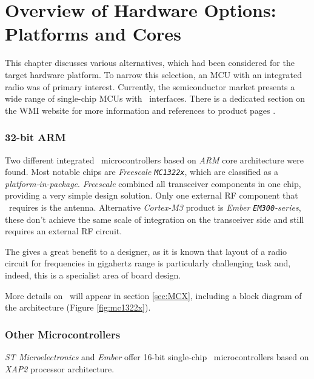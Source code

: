 \section{Overview of Hardware Options: \\Platforms and Cores} \label{sec:hwintro}


 This chapter discusses various alternatives, which had been
 considered for the target hardware platform. To narrow this
 selection, an MCU with an integrated radio was of primary
 interest. Currently, the semiconductor market presents a
 wide range of single-chip MCUs with \WPAN\ interfaces. There
 is a dedicated section on the WMI website for more information
 and references to product pages \cite{wmi:wiki:chips1,
 wmi:wiki:chips2}.

\subsubsection{32-bit ARM}

 Two different integrated \WPAN\ microcontrollers based on 
 \emph{ARM} core architecture were found. Most notable
 chips are \emph{Freescale \texttt{MC1322x}}, which are
 classified as a \emph{platform-in-package}. \emph{Freescale}
 combined all transceiver components in one chip, providing
 a very simple design solution. Only one external RF component
 that \MCX\ requires is the antenna. Alternative \emph{Cortex-M3}
 product is \emph{Ember \texttt{EM300}-series}, these don't
 achieve the same scale of integration on the transceiver side
 and still requires an external RF circuit.

 The  gives a great benefit to a designer, as it
 is known that layout of a radio circuit for frequencies in
 gigahertz range is particularly challenging task and, indeed,
 this is a specialist area of board design.

 More details on \MCX\ will appear in section \ref{sec:MCX},
 including a block diagram of the architecture (Figure \ref{fig:mc1322x}).

\subsubsection{Other Microcontrollers}

 \emph{ST Microelectronics} and \emph{Ember} offer 16-bit single-chip
 \WPAN\ microcontrollers based on \emph{XAP2} processor architecture.

